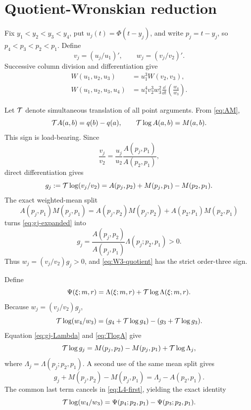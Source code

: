 \section{Quotient-Wronskian reduction}\label{sec:quotient}

Fix \(y_1<y_2<y_3<y_4\), put \(u_j(t)=\Phi(t-y_j)\), and write
\(p_j=t-y_j\), so \(p_4<p_3<p_2<p_1\). Define
\[
 v_j=(u_j/u_1)',\qquad w_j=(v_j/v_2)'.
\]
Successive column division and differentiation give
\begin{align}
 W(u_1,u_2,u_3)&=u_1^3W(v_2,v_3),\label{eq:W3-quotient}\\
 W(u_1,u_2,u_3,u_4)&=u_1^4v_2^3w_3^2
 \frac{\dd}{\dd t}\left(\frac{w_4}{w_3}\right).
 \label{eq:W4-quotient}
\end{align}

Let \(\mathcal{T}\) denote simultaneous translation of all point arguments. From
\eqref{eq:AM},
\begin{equation}\label{eq:TlogA}
 \mathcal{T} A(a,b)=q(b)-q(a),\qquad \mathcal{T}\log A(a,b)=M(a,b).
\end{equation}
This sign is load-bearing. Since
\[
 \frac{v_j}{v_2}=\frac{u_j}{u_2}
 \frac{A(p_j,p_1)}{A(p_2,p_1)},
\]
direct differentiation gives
\begin{equation}\label{eq:gj-expanded}
 g_j:=\mathcal{T}\log(v_j/v_2)
 =A(p_j,p_2)+M(p_j,p_1)-M(p_2,p_1).
\end{equation}
The exact weighted-mean split
\[
 A(p_j,p_1)M(p_j,p_1)
 =A(p_j,p_2)M(p_j,p_2)+A(p_2,p_1)M(p_2,p_1)
\]
turns \eqref{eq:gj-expanded} into
\begin{equation}\label{eq:gj-Lambda}
 g_j=\frac{A(p_j,p_2)}{A(p_j,p_1)}
 \Lambda(p_j;p_2,p_1)>0.
\end{equation}
Thus \(w_j=(v_j/v_2)g_j>0\), and
\eqref{eq:W3-quotient} has the strict order-three sign.

Define
\[
 \Psi(\xi;m,r)=\Lambda(\xi;m,r)+\mathcal{T}\log\Lambda(\xi;m,r).
\]
Because \(w_j=(v_j/v_2)g_j\),
\begin{equation}\label{eq:L4-first}
 \mathcal{T}\log(w_4/w_3)
 =(g_4+\mathcal{T}\log g_4)-(g_3+\mathcal{T}\log g_3).
\end{equation}
Equation \eqref{eq:gj-Lambda} and \eqref{eq:TlogA} give
\[
 \mathcal{T}\log g_j=M(p_j,p_2)-M(p_j,p_1)+\mathcal{T}\log\Lambda_j,
\]
where \(\Lambda_j=\Lambda(p_j;p_2,p_1)\). A second use of the same mean split
gives
\[
 g_j+M(p_j,p_2)-M(p_j,p_1)=\Lambda_j-A(p_2,p_1).
\]
The common last term cancels in \eqref{eq:L4-first}, yielding the exact
identity
\begin{equation}\label{eq:L4-Psi}
 \mathcal{T}\log(w_4/w_3)
 =\Psi(p_4;p_2,p_1)-\Psi(p_3;p_2,p_1).
\end{equation}

